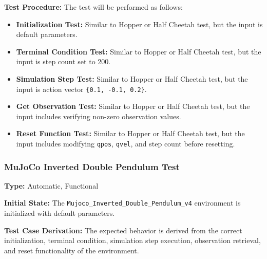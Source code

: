 \documentclass[12pt, titlepage]{article}
\begin{document}
\textbf{Test Procedure:} The test will be performed as follows:
\begin{itemize}
    \item \textbf{Initialization Test:} Similar to Hopper or Half Cheetah test, but the input is default parameters.
    
    \item \textbf{Terminal Condition Test:} Similar to Hopper or Half Cheetah test, but the input is step count set to 200.
    
    \item \textbf{Simulation Step Test:} Similar to Hopper or Half Cheetah test, but the input is action vector \texttt{\{0.1, -0.1, 0.2\}}.
    
    \item \textbf{Get Observation Test:} Similar to Hopper or Half Cheetah test, but the input includes verifying non-zero observation values.
    
    \item \textbf{Reset Function Test:} Similar to Hopper or Half Cheetah test, but the input includes modifying \texttt{qpos}, \texttt{qvel}, and step count before resetting.
\end{itemize}


\subsubsection{MuJoCo Inverted Double Pendulum Test}

\textbf{Type:} Automatic, Functional

\textbf{Initial State:} The \texttt{Mujoco\_Inverted\_Double\_Pendulum\_v4} environment is initialized with default parameters.

\textbf{Test Case Derivation:} The expected behavior is derived from the correct initialization, terminal condition, simulation step execution, observation retrieval, and reset functionality of the environment.
\end{document}
